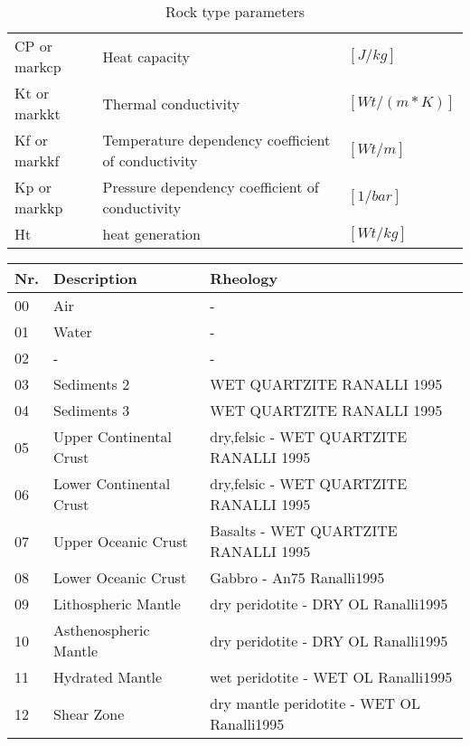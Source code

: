\begin{table}[H]
\begin{tabular}{l p{8cm} l}
CP or markcp & Heat capacity  & $[J/kg]$ \\ 
Kt or markkt & Thermal conductivity & $[Wt/(m*K)]$ \\ 
Kf or markkf & Temperature dependency coefficient of conductivity & $[Wt/m]$ \\ 
Kp or markkp & Pressure dependency coefficient of conductivity & $[1/bar]$ \\ 
Ht & heat generation & $[Wt/kg]$\\ 
\bottomrule
\end{tabular}
\caption{Rock type parameters}
\label{tbl:rock_type_parameters}
\end{table}


\begin{table}[H]
\small
\centering
\begin{tabular}{l p{6cm} p{8cm}}
\toprule
Nr. & Description & Rheology\\
\midrule
\rowcolor[rgb]{1.0000    1.0000    1.0000}
00 & Air & -\\
\rowcolor[rgb]{0.5059    0.9961    0.7882}
01 & Water & -\\
\rowcolor[rgb]{1.0000    1.0000    1.0000}
02 & - &  - \\
\rowcolor[rgb]{0.6824    0.3412         0}
03 & Sediments 2 & WET QUARTZITE RANALLI 1995 \\
\rowcolor[rgb]{1.0000    0.5020         0}
04 & Sediments 3 & WET QUARTZITE RANALLI 1995 \\
\rowcolor[rgb]{0.7529    0.7529    0.7529}
05 & Upper Continental Crust & dry,felsic - WET QUARTZITE RANALLI 1995 \\
\rowcolor[rgb]{0.5020    0.5020    0.5020}
06 & Lower Continental Crust & dry,felsic - WET QUARTZITE RANALLI 1995 \\
\rowcolor[rgb]{ 0    0.5020         0}
07 & Upper Oceanic Crust & Basalts - WET QUARTZITE RANALLI 1995 \\
\rowcolor[rgb]{0    0.8431         0}
08 & Lower Oceanic Crust & Gabbro - An75 Ranalli1995 \\
\rowcolor[rgb]{0         0    0.7177}
09 & Lithospheric Mantle & dry peridotite - DRY OL Ranalli1995 \\
\rowcolor[rgb]{ 0.3216    0.2000    0.6745}
10 & Asthenospheric Mantle & dry peridotite - DRY OL Ranalli1995 \\
\rowcolor[rgb]{0.5412    0.7216    0.9922}
11 & Hydrated Mantle & wet peridotite - WET OL Ranalli1995 \\
\rowcolor[rgb]{0    0.5020    1.0000}
12 & Shear Zone & dry mantle peridotite - WET OL Ranalli1995 \\

\end{tabular}
\end{table}
